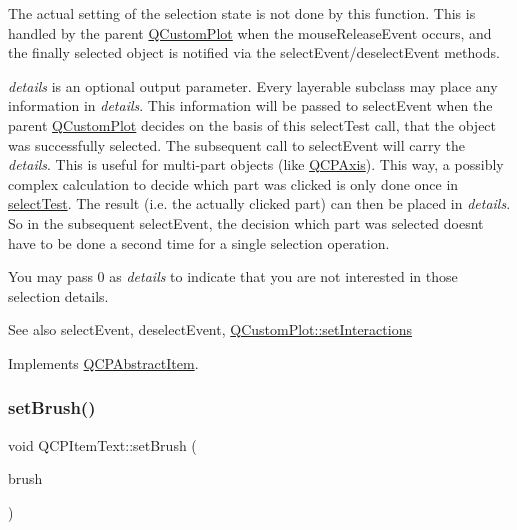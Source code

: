 The actual setting of the selection state is not done by this function. This is handled by the parent \mbox{\hyperlink{class_q_custom_plot}{Q\+Custom\+Plot}} when the mouse\+Release\+Event occurs, and the finally selected object is notified via the select\+Event/deselect\+Event methods.

{\itshape details} is an optional output parameter. Every layerable subclass may place any information in {\itshape details}. This information will be passed to select\+Event when the parent \mbox{\hyperlink{class_q_custom_plot}{Q\+Custom\+Plot}} decides on the basis of this select\+Test call, that the object was successfully selected. The subsequent call to select\+Event will carry the {\itshape details}. This is useful for multi-\/part objects (like \mbox{\hyperlink{class_q_c_p_axis}{Q\+C\+P\+Axis}}). This way, a possibly complex calculation to decide which part was clicked is only done once in \mbox{\hyperlink{class_q_c_p_item_text_aca74494fd5e769f331a6eb3e29f32916}{select\+Test}}. The result (i.\+e. the actually clicked part) can then be placed in {\itshape details}. So in the subsequent select\+Event, the decision which part was selected doesn\textquotesingle{}t have to be done a second time for a single selection operation.

You may pass 0 as {\itshape details} to indicate that you are not interested in those selection details.

\begin{DoxySeeAlso}{See also}
select\+Event, deselect\+Event, \mbox{\hyperlink{class_q_custom_plot_a5ee1e2f6ae27419deca53e75907c27e5}{Q\+Custom\+Plot\+::set\+Interactions}} 
\end{DoxySeeAlso}


Implements \mbox{\hyperlink{class_q_c_p_abstract_item_a96d522d10ffc0413b9a366c6f7f0476b}{Q\+C\+P\+Abstract\+Item}}.

\mbox{\label{class_q_c_p_item_text_a1c7e131516df2ed8d941ef31240ded8e}} 
\subsubsection{\texorpdfstring{set\+Brush()}{setBrush()}}
{\footnotesize\ttfamily void Q\+C\+P\+Item\+Text\+::set\+Brush (\begin{DoxyParamCaption}\item[{const Q\+Brush \&}]{brush }\end{DoxyParamCaption})}

